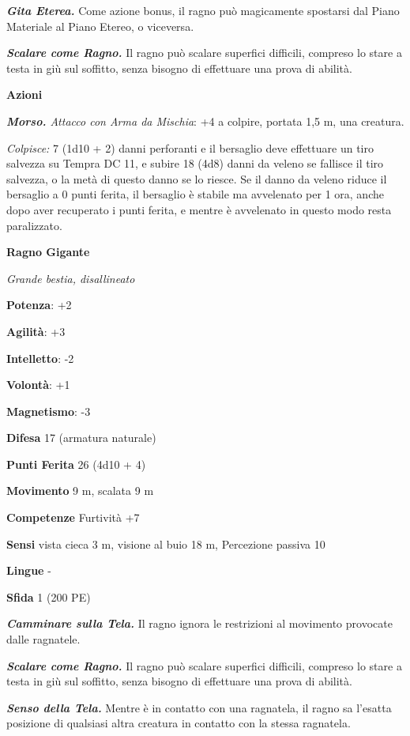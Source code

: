 \begin{multicols}{2}
\emph{\textbf{Gita Eterea.}} Come azione bonus, il ragno può magicamente
spostarsi dal Piano Materiale al Piano Etereo, o viceversa.

\emph{\textbf{Scalare come Ragno.}} Il ragno può scalare superfici
difficili, compreso lo stare a testa in giù sul soffitto, senza bisogno
di effettuare una prova di abilità.

\textbf{Azioni}

\emph{\textbf{Morso.} Attacco con Arma da Mischia}: +4 a colpire,
portata 1,5 m, una creatura.

\emph{Colpisce:} 7 (1d10 + 2) danni perforanti e il bersaglio deve
effettuare un tiro salvezza su Tempra DC 11, e subire 18 (4d8)
danni da veleno se fallisce il tiro salvezza, o la metà di questo danno
se lo riesce. Se il danno da veleno riduce il bersaglio a 0 punti
ferita, il bersaglio è stabile ma avvelenato per 1 ora, anche dopo aver
recuperato i punti ferita, e mentre è avvelenato in questo modo resta
paralizzato.

\textbf{Ragno Gigante}

\emph{Grande bestia, disallineato}

\textbf{Potenza}: +2

\textbf{Agilità}: +3

\textbf{Intelletto}: -2

\textbf{Volontà}: +1

\textbf{Magnetismo}: -3

\textbf{Difesa} 17 (armatura naturale)

\textbf{Punti Ferita} 26 (4d10 + 4)

\textbf{Movimento} 9 m, scalata 9 m

\textbf{Competenze} Furtività +7

\textbf{Sensi} vista cieca 3 m, visione al buio 18 m, Percezione passiva
10

\textbf{Lingue} -

\textbf{Sfida} 1 (200 PE)

\emph{\textbf{Camminare sulla Tela.}} Il ragno ignora le restrizioni al
movimento provocate dalle ragnatele.

\emph{\textbf{Scalare come Ragno.}} Il ragno può scalare superfici
difficili, compreso lo stare a testa in giù sul soffitto, senza bisogno
di effettuare una prova di abilità.

\emph{\textbf{Senso della Tela.}} Mentre è in contatto con una
ragnatela, il ragno sa l'esatta posizione di qualsiasi altra creatura in
contatto con la stessa ragnatela.


\end{multicols}
